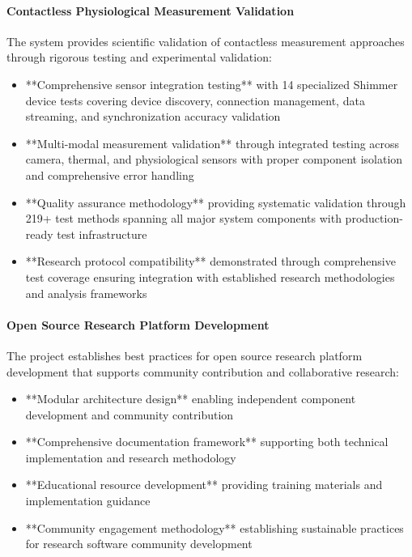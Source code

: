 \documentclass[12pt,a4paper]{article}
\begin{document}
\paragraph{Contactless Physiological Measurement Validation}

The system provides scientific validation of contactless measurement approaches through rigorous testing and
experimental validation:

\begin{itemize}
\item **Comprehensive sensor integration testing** with 14 specialized Shimmer device tests covering device discovery, 
  connection management, data streaming, and synchronization accuracy validation
\item **Multi-modal measurement validation** through integrated testing across camera, thermal, and physiological 
  sensors with proper component isolation and comprehensive error handling
\item **Quality assurance methodology** providing systematic validation through 219+ test methods spanning all major 
  system components with production-ready test infrastructure
\item **Research protocol compatibility** demonstrated through comprehensive test coverage ensuring integration with 
  established research methodologies and analysis frameworks

\end{itemize}
\paragraph{Open Source Research Platform Development}

The project establishes best practices for open source research platform development that supports community
contribution and collaborative research:

\begin{itemize}
\item **Modular architecture design** enabling independent component development and community contribution
\item **Comprehensive documentation framework** supporting both technical implementation and research methodology
\item **Educational resource development** providing training materials and implementation guidance
\item **Community engagement methodology** establishing sustainable practices for research software community development

\end{itemize}
\end{document}
